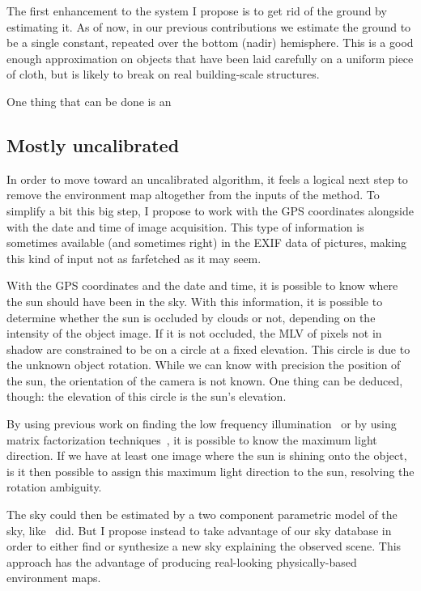 The first enhancement to the system I propose is to get rid of the ground by estimating it. As of now, in our previous contributions we estimate the ground to be a single constant, repeated over the bottom (nadir) hemisphere. This is a good enough approximation on objects that have been laid carefully on a uniform piece of cloth, but is likely to break on real building-scale structures.

One thing that can be done is an 


\subsection{Mostly uncalibrated}
In order to move toward an uncalibrated algorithm, it feels a logical next step to remove the environment map altogether from the inputs of the method. To simplify a bit this big step, I propose to work with the GPS coordinates alongside with the date and time of image acquisition. This type of information is sometimes available (and sometimes right) in the EXIF data of pictures, making this kind of input not as farfetched as it may seem.

With the GPS coordinates and the date and time, it is possible to know where the sun should have been in the sky. With this information, it is possible to determine whether the sun is occluded by clouds or not, depending on the intensity of the object image. If it is not occluded, the MLV of pixels not in shadow are constrained to be on a circle at a fixed elevation. This circle is due to the unknown object rotation. While we can know with precision the position of the sun, the orientation of the camera is not known. One thing can be deduced, though: the elevation of this circle is the sun's elevation.

By using previous work on finding the low frequency illumination~\cite{basri-ijcv-2007} or by using matrix factorization techniques~\cite{shi-cvpr-10}, it is possible to know the maximum light direction. If we have at least one image where the sun is shining onto the object, is it then possible to assign this maximum light direction to the sun, resolving the rotation ambiguity.

The sky could then be estimated by a two component parametric model of the sky, like~\cite{jung-cvpr-15} did. But I propose instead to take advantage of our sky database in order to either find or synthesize a new sky explaining the observed scene. This approach has the advantage of producing real-looking physically-based environment maps.

